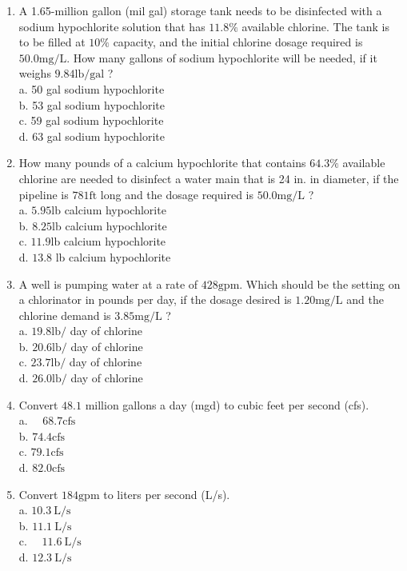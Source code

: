 \documentclass[10pt]{article}
\begin{document}
\begin{enumerate}
  \item A 1.65-million gallon (mil gal) storage tank needs to be disinfected with a sodium hypochlorite solution that has $11.8 \%$ available chlorine. The tank is to be filled at $10 \%$ capacity, and the initial chlorine dosage required is $50.0 \mathrm{mg} / \mathrm{L}$. How many gallons of sodium hypochlorite will be needed, if it weighs $9.84 \mathrm{lb} / \mathrm{gal}$ ?\\
a. 50 gal sodium hypochlorite\\
b. 53 gal sodium hypochlorite\\
c. 59 gal sodium hypochlorite\\
d. 63 gal sodium hypochlorite

  \item How many pounds of a calcium hypochlorite that contains $64.3 \%$ available chlorine are needed to disinfect a water main that is 24 in. in diameter, if the pipeline is $781 \mathrm{ft}$ long and the dosage required is $50.0 \mathrm{mg} / \mathrm{L}$ ?\\
a. $5.95 \mathrm{lb}$ calcium hypochlorite\\
b. $8.25 \mathrm{lb}$ calcium hypochlorite\\
c. $11.9 \mathrm{lb}$ calcium hypochlorite\\
d. $13.8$ lb calcium hypochlorite

  \item A well is pumping water at a rate of $428 \mathrm{gpm}$. Which should be the setting on a chlorinator in pounds per day, if the dosage desired is $1.20 \mathrm{mg} / \mathrm{L}$ and the chlorine demand is $3.85 \mathrm{mg} / \mathrm{L}$ ?\\
a. $19.8 \mathrm{lb} /$ day of chlorine\\
b. $20.6 \mathrm{lb} /$ day of chlorine\\
c. $23.7 \mathrm{lb} /$ day of chlorine\\
d. $26.0 \mathrm{lb} /$ day of chlorine

  \item Convert $48.1$ million gallons a day (mgd) to cubic feet per second (cfs).\\
a. $\quad 68.7 \mathrm{cfs}$\\
b. $74.4 \mathrm{cfs}$\\
c. $79.1 \mathrm{cfs}$\\
d. $82.0 \mathrm{cfs}$

  \item Convert $184 \mathrm{gpm}$ to liters per second (L/s).\\
a. $10.3 \mathrm{~L} / \mathrm{s}$\\
b. $11.1 \mathrm{~L} / \mathrm{s}$\\
c. $\quad 11.6 \mathrm{~L} / \mathrm{s}$\\
d. $12.3 \mathrm{~L} / \mathrm{s}$ 


\end{enumerate}
\end{document}
